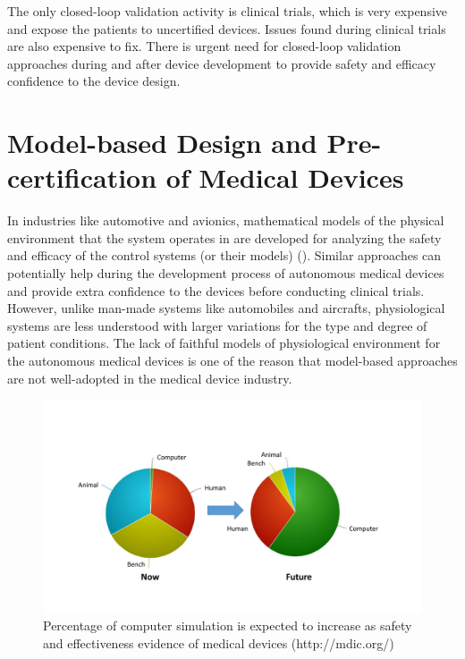 The only closed-loop validation activity is clinical trials, which is very expensive and expose the patients to uncertified devices. 
Issues found during clinical trials are also expensive to fix.
There is urgent need for closed-loop validation approaches during and after device development to provide safety and efficacy confidence to the device design.
\section{Model-based Design and Pre-certification of Medical Devices}
In industries like automotive and avionics, mathematical models of the physical environment that the system operates in are developed for analyzing the safety and efficacy of the control systems (or their models) (\cite{autosar, avsi}).
Similar approaches can potentially help during the development process of autonomous medical devices and provide extra confidence to the devices before conducting clinical trials. 
However, unlike man-made systems like automobiles and aircrafts, physiological systems are less understood with larger variations for the type and degree of patient conditions. 
The lack of faithful models of physiological environment for the autonomous medical devices is one of the reason that model-based approaches are not well-adopted in the medical device industry. 
\begin{figure}[t]
		\centering
		\includegraphics[width=\textwidth]{figs/MDIC.pdf}
		\caption{\small Percentage of computer simulation is expected to increase as safety and effectiveness evidence of medical devices (http://mdic.org/)}
		\label{fig:MDIC}
\end{figure}

